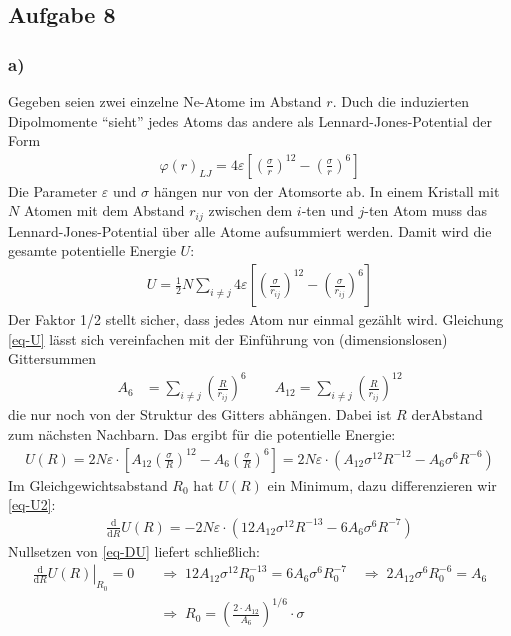 \documentclass[11pt]{article}
\begin{document}
\subsection*{Aufgabe 8}
\subsubsection*{a)}
Gegeben seien zwei einzelne Ne-Atome im Abstand $r$. Duch die induzierten
Dipolmomente "`sieht"' jedes Atoms das andere als Lennard-Jones-Potential der Form
\begin{align}
  \varphi(r)_{LJ} = 4 \varepsilon \left[ \left(\frac{\sigma}{r}\right)^{12} -
    \left(\frac{\sigma}{r}\right)^{6} \right]
\end{align}
Die Parameter $\varepsilon$ und $\sigma$ hängen nur von der Atomsorte ab.
In einem Kristall mit $N$ Atomen mit dem Abstand $r_{ij}$ zwischen dem
$i$-ten und $j$-ten Atom muss das Lennard-Jones-Potential über alle Atome
aufsummiert werden. Damit wird die gesamte potentielle Energie $U$:
\begin{align}
\label{eq-U}
  U = \frac{1}{2} N \sum_{i \ne j} 4 \varepsilon
  \left[ \left(\frac{\sigma}{r_{ij}}\right)^{12} -
  \left(\frac{\sigma}{r_{ij}}\right)^{6} \right]
\end{align}
Der Faktor 1/2 stellt sicher, dass jedes Atom nur einmal gezählt wird.
Gleichung \eqref{eq-U} lässt sich vereinfachen mit der Einführung von
(dimensionslosen) Gittersummen
\begin{align*}
  A_6 & = \left . \sum_{i \ne j} \left(\frac{R}{r_{ij}}\right)^6 \right .\qquad
  A_{12} = \sum_{i \ne j} \left(\frac{R}{r_{ij}}\right)^{12}
\end{align*}
die nur noch von der Struktur des Gitters abhängen.  Dabei ist $R$ derAbstand
zum nächsten Nachbarn. Das ergibt für die potentielle Energie:
\begin{align}
\label{eq-U2}
  U(R) = 2 N \varepsilon \cdot \left[ A_{12} \left(\frac{\sigma}{R}\right)^{12} -
  A_6 \left(\frac{\sigma}{R}\right)^{6} \right] =
  2 N \varepsilon \cdot \left( A_{12} \sigma^{12} R^{-12} -
  A_6 \sigma^6 R^{-6} \right)
\end{align}
Im Gleichgewichtsabstand $R_0$ hat $U(R)$ ein Minimum, dazu differenzieren
wir \eqref{eq-U2}:
\begin{align}
\label{eq-DU}
  \frac{\mathrm{d}}{\mathrm{d} R} U(R) = - 2 N \varepsilon \cdot
    \left(12 A_{12} \sigma^{12} R^{-13} - 6 A_6 \sigma^6 R^{-7} \right)
\end{align}
Nullsetzen von \eqref{eq-DU} liefert schließlich:
\begin{align}
  \nonumber
  \left. \frac{\mathrm{d}}{\mathrm{d} R} U(R) \right|_{R_0} = 0 \quad& \Rightarrow\;
  12 A_{12} \sigma^{12} R_0^{-13} = 6 A_6 \sigma^6 R_0^{-7} \quad \Rightarrow\;
  2 A_{12} \sigma^6 R_0^{-6} = A_6 \\
  \label{eq-R0}
  \;& \Rightarrow\; R_0 = \left(\frac{2 \cdot A_{12}}{A_6}\right)^{1/6} \cdot \sigma
\end{align}
\end{document}
